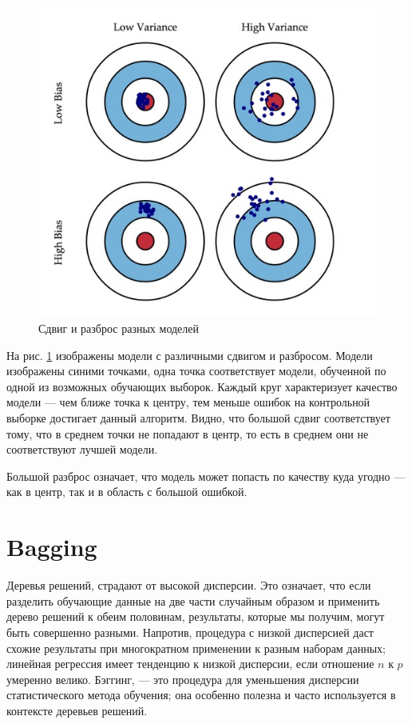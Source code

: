 \documentclass{article}
\theoremstyle{definition}
\theoremstyle{theorem}
\theoremstyle{remark}
\theoremstyle{theorem}
\theoremstyle{example}
\theoremstyle{theorem}
\theoremstyle{theorem}
\theoremstyle{theorem}
\theoremstyle{theorem}
\begin{document}
\begin{figure}[!ht]
	\centering
	\includegraphics[width=1\textwidth]{img/bias_var.jpg}
	\caption{Сдвиг и разброс разных моделей}
	\label{fig:bias_var}
\end{figure}


На рис. \ref{fig:bias_var} изображены модели с различными сдвигом и разбросом. Модели изображены синими точками, одна точка соответствует модели, обученной по одной из возможных обучающих выборок. Каждый круг характеризует качество модели --- чем ближе точка к центру, тем меньше ошибок на контрольной выборке достигает данный алгоритм. Видно, что большой сдвиг соответствует тому, что в среднем точки не попадают в центр, то есть в среднем они не соответствуют лучшей модели.

Большой разброс означает, что модель может попасть по качеству куда угодно --- как в центр, так и в область с большой ошибкой.

\section{Bagging}

Деревья решений, страдают от высокой дисперсии. Это означает, что если разделить обучающие данные на две части случайным образом и применить дерево решений к обеим половинам, результаты, которые мы получим, могут быть совершенно разными. Напротив, процедура с низкой дисперсией даст схожие результаты при многократном применении к разным наборам данных; линейная регрессия имеет тенденцию к низкой дисперсии, если отношение $n$ к $p$ умеренно велико. Бэггинг, --- это процедура для уменьшения дисперсии статистического метода обучения; она особенно полезна и часто используется в контексте деревьев решений.
\end{document}

